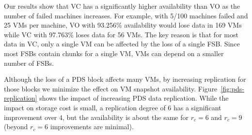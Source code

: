 Our results show that VC  has a significantly  higher availability than VO as the number of failed machines increases.
For example, with 5/100 machines failed and 25 VMs per machine, VO with 93.256\% availability would lose data in 169 VMs 
while VC with 97.763\% loses data for 56 VMs.
The key reason is that for most data in VC, only a single
VM can be affected by the loss of a single FSB. Since most FSBs contain chunks for a single VM, VMs can depend on a smaller number of FSBs.

Although the loss of a PDS block affects many VMs,
by increasing replication for those blocks we minimize the effect on VM snapshot availability.
%
Figure~\ref{fig:pds-replication} shows
the impact of increasing PDS data replication. 
While the impact on storage cost is small, 
a replication degree of 6  has a significant improvement over 4, but the availability is about
the same for $r_c=6$ and $r_c=9$ (beyond $r_c=6$ improvements are minimal).
 

